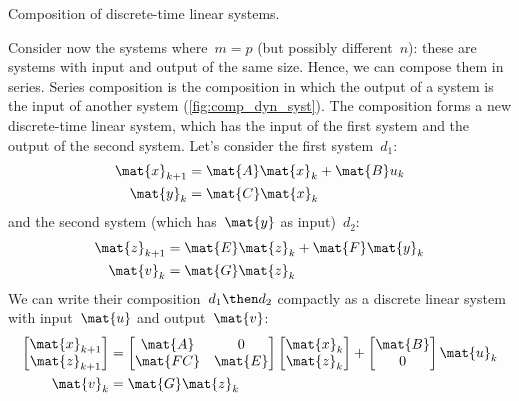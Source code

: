 \begin{marginfigure}
\begin{center}
\end{center}
\caption{Composition of discrete-time linear systems.}
\label{fig:comp_dyn_syst}
\end{marginfigure}

Consider now the systems where~$m=p$ (but possibly different~$n$): these are systems with input and output of the same size. Hence, we can compose them in series.
Series composition is the composition in which the output of a system is the input of another system (\cref{fig:comp_dyn_syst}).
The composition forms a new discrete-time linear system, which has the input of the first system and the output of the second system.
Let's consider the first system~$d_1$:
\begin{equation*}
\label{eq:dlin-1}
      \begin{aligned}
        \mat{x}_{k+1} &= \mat{A} \mat{x}_k  + \mat{B} u_k \\
        \mat{y}_{k}   &= \mat{C} \mat{x}_k  \\
      \end{aligned}
    \end{equation*}
and the second system (which has~$\mat{y}$ as input)~$d_2$:
\begin{equation*}
\label{eq:dlin-2}
      \begin{aligned}
        \mat{z}_{k+1} &= \mat{E} \mat{z}_k  + \mat{F} \mat{y}_k \\
        \mat{v}_{k}   &= \mat{G} \mat{z}_k  \\
      \end{aligned}
    \end{equation*}
We can write their composition~$d_1\then d_2$ compactly as a discrete linear system with input~$\mat{u}$ and output~$\mat{v}$:
\begin{equation*}
\label{eq:dlin-3}
\begin{aligned}
\begin{bmatrix}
\mat{x}_{k+1}\\
\mat{z}_{k+1}
\end{bmatrix}&=
\begin{bmatrix}
\mat{A}&0\\
\mat{FC}&\mat{E}
\end{bmatrix}\begin{bmatrix} \mat{x}_k\\ \mat{z}_k\end{bmatrix}+
\begin{bmatrix}
\mat{B}\\ 0
\end{bmatrix}\mat{u}_k\\
\mat{v}_k&=\mat{G}\mat{z}_k
\end{aligned}
\end{equation*}

